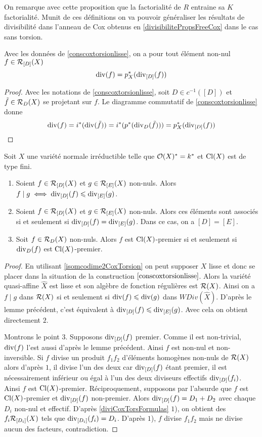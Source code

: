 On remarque avec cette proposition que la factorialité de $R$ entraine sa $K$ factorialité. Munit de ces définitions on va pouvoir généraliser les résultats de divisibilité dans l'anneau de Cox obtenus en \ref{divisibilitePropsFreeCox} dans le cas sans torsion.

\begin{lem}
Avec les données de \ref{conscoxtorsionlisse}, on a pour tout élément non-nul $f\in \mathcal{R}_{[D]}(X)$
$$\operatorname{div}(f)=p^*_X(\operatorname{div}_{[D]}(f))$$
\end{lem}
\begin{proof}
Avec les notations de \ref{conscoxtorsionlisse}, soit $D\in c^{-1}([D])$ et $\tilde{f}\in\mathcal{R}_D(X)$ se projetant sur $f$. Le diagramme commutatif de \ref{conscoxtorsionlisse} donne
$$\operatorname{div}(f)=i^*(\operatorname{div}(\tilde{f}))=i^*(p^*(\operatorname{div}_D(\tilde{f})))=p_X^*(\operatorname{div}_{[D]}(f))$$
\end{proof}

\begin{prop}
Soit $X$ une variété normale irréductible telle que $\mathcal{O}(X)^*=k^*$ et $\operatorname{Cl}(X)$ est de type fini.
\begin{enumerate}
\item Soient $f\in \mathcal{R}_{[D]}(X)$ et $g\in \mathcal{R}_{[E]}(X)$ non-nuls. Alors $f\mid g\iff \operatorname{div}_{[D]}(f)\leqslant\operatorname{div}_{[E]}(g)$.
\item Soient $f\in \mathcal{R}_{[D]}(X)$ et $g\in \mathcal{R}_{[E]}(X)$ non-nuls. Alors ces éléments sont associés si et seulement si $\operatorname{div}_{[D]}(f)=\operatorname{div}_{[E]}(g)$. Dans ce cas, on a $[D]=[E]$.
\item Soit $f\in \mathcal{R}_D(X)$ non-nuls. Alors $f$ est $\operatorname{Cl}(X)$-premier si et seulement si $\operatorname{div}_D(f)$ est $\operatorname{Cl}(X)$-premier.
\end{enumerate}
\end{prop}
\begin{proof}
En utilisant \ref{isomcodime2CoxTorsion} on peut supposer $X$ lisse et donc se placer dans la situation de la construction $\ref{conscoxtorsionlisse}$. Alors la variété quasi-affine $\widehat{X}$ est lisse et son algèbre de fonction régulières est $\mathcal{R}(X)$. Ainsi on a $f\mid g$ dans $\mathcal{R}(X)$ si et seulement si $\operatorname{div}(f)\leqslant \operatorname{div}(g)$ dans $WDiv(\widehat{X})$. D'après le lemme précédent, c'est équivalent à $\operatorname{div}_{[D]}(f)\leqslant\operatorname{div}_{[E]}(g)$. Avec cela on obtient directement $2$.

Montrons le point $3$. Supposons $\operatorname{div}_{[D]}(f)$ premier. Comme il est non-trivial, $\operatorname{div}(f)$ l'est aussi d'après le lemme précédent. Ainsi $f$ est non-nul et non-inversible. Si $f$ divise un produit $f_1f_2$ d'éléments homogènes non-nuls de $\mathcal{R}(X)$ alors d'après $1$, il divise l'un des deux car $\operatorname{div}_{[D]}(f)$ étant premier, il est nécessairement inférieur ou égal à l'un des deux diviseurs effectifs  $\operatorname{div}_{[D]}(f_i)$. Ainsi $f$ est $\operatorname{Cl}(X)$-premier. Réciproquement, supposons par l'absurde que $f$ est $\operatorname{Cl}(X)$-premier et $\operatorname{div}_{[D]}(f)$ non-premier. Alors $\operatorname{div}_{[D]}(f)=D_1+D_2$ avec chaque $D_i$ non-nul et effectif. D'après \ref{diviCoxTorsFormulas} $1$), on obtient des $f_i\mathcal{R}_{[D_i]}(X)$ tels que $\operatorname{div}_{[D_i]}(f_i)=D_i$. D'après $1$), $f$ divise $f_1f_2$ mais ne divise aucun des facteurs, contradiction.
\end{proof}

